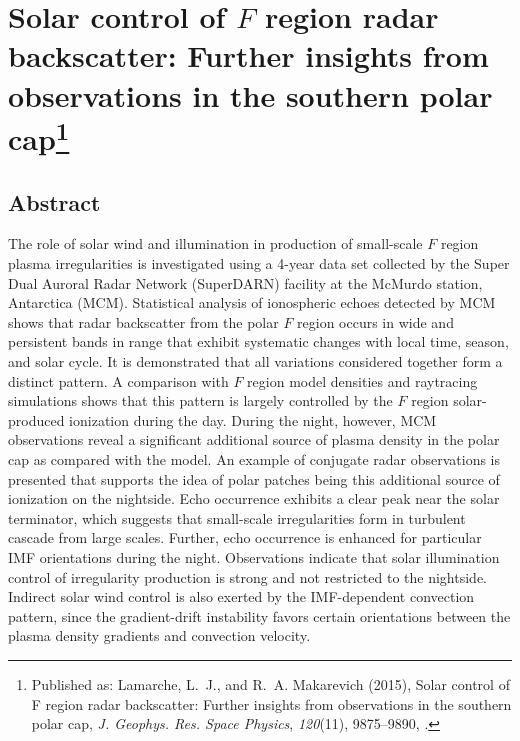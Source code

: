 
\chapter[Solar control of \(F\) region radar backscatter: Further insights from observations in the southern polar cap]{Solar control of \(F\) region radar backscatter: Further insights from observations in the southern polar cap\footnote{Published as: {Lamarche}, L.~J., and R.~A. {Makarevich} (2015), Solar control of {F} region radar backscatter: Further insights from observations in the southern polar cap, \textit{J. Geophys. Res. Space Physics}, \textit{120}(11), 9875--9890, .}}

\label{sec:paper1}



\section*{Abstract}
The role of solar wind and illumination in production of small-scale \(F\) region plasma irregularities is investigated using a 4-year data set collected by the Super Dual Auroral Radar Network (SuperDARN) facility at the McMurdo station, Antarctica (MCM). Statistical analysis of ionospheric echoes detected by MCM shows that radar backscatter from the polar \(F\) region occurs in wide and persistent bands in range that exhibit systematic changes with local time, season, and solar cycle. It is demonstrated that all variations considered together form a distinct pattern. A comparison with \(F\) region model densities and raytracing simulations shows that this pattern is largely controlled by the \(F\) region solar-produced ionization during the day. During the night, however, MCM observations reveal a significant additional source of plasma density in the polar cap as compared with the model. An example of conjugate radar observations is presented that supports the idea of polar patches being this additional source of ionization on the nightside. Echo occurrence exhibits a clear peak near the solar terminator, which suggests that small-scale irregularities form in turbulent cascade from large scales. Further, echo occurrence is enhanced for particular IMF orientations during the night. Observations indicate that solar illumination control of irregularity production is strong and not restricted to the nightside. Indirect solar wind control is also exerted by the IMF-dependent convection pattern, since the gradient-drift instability favors certain orientations between the plasma density gradients and convection velocity.


